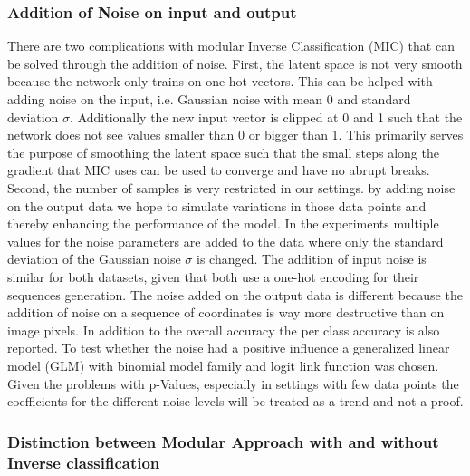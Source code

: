 \documentclass{article}
\begin{document}
\subsubsection{Addition of Noise on input and output}

There are two complications with modular Inverse Classification (MIC) that can be solved through the addition of noise. First, the latent space is not very smooth because the network only trains on one-hot vectors. This can be helped with adding noise on the input, i.e. Gaussian noise with mean 0 and standard deviation $\sigma$. Additionally the new input vector is clipped at 0 and 1 such that the network does not see values smaller than 0 or bigger than 1. This primarily serves the purpose of smoothing the latent space such that the small steps along the gradient that MIC uses can be used to converge and have no abrupt breaks. Second, the number of samples is very restricted in our settings. by adding noise on the output data we hope to simulate variations in those data points and thereby enhancing the performance of the model. In the experiments multiple values for the noise parameters are added to the data where only the standard deviation of the Gaussian noise $\sigma$ is changed. The addition of input noise is similar for both datasets, given that both use a one-hot encoding for their sequences generation. The noise added on the output data is different because the addition of noise on a sequence of coordinates is way more destructive than on image pixels. In addition to the overall accuracy the per class accuracy is also reported. To test whether the noise had a positive influence a generalized linear model (GLM) with binomial model family and logit link function was chosen. Given the problems with p-Values, especially in settings with few data points the coefficients for the different noise levels will be treated as a trend and not a proof.

\subsubsection{Distinction between Modular Approach with and without Inverse classification}
\end{document}
